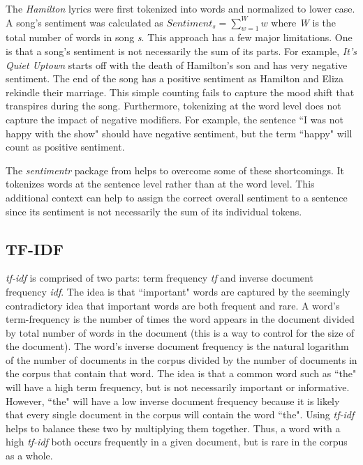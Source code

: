 \documentclass{article}
\begin{document}
The \emph{Hamilton} lyrics were first tokenized into words and normalized to lower case. A song's sentiment was calculated as $Sentiment_{s} = \sum_{w = 1}^{W}w$ where \emph{W} is the total number of words in song \emph{s}. This approach has a few major limitations. One is that a song's sentiment is not necessarily the sum of its parts. For example, \emph{It's Quiet Uptown} starts off with the death of Hamilton's son and has very negative sentiment. The end of the song has a positive sentiment as Hamilton and Eliza rekindle their marriage. This simple counting fails to capture the mood shift that transpires during the song. Furthermore, tokenizing at the word level does not capture the impact of negative modifiers. For example, the sentence ``I was not happy with the show" should have negative sentiment, but the term ``happy" will count as positive sentiment.

The \emph{sentimentr} package from \cite{sentimentr} helps to overcome some of these shortcomings. It tokenizes words at the sentence level rather than at the word level. This additional context can help to assign the correct overall sentiment to a sentence since its sentiment is not necessarily the sum of its individual tokens. 

\subsection{TF-IDF}
\label{section:tf-idf}

\emph{tf-idf} is comprised of two parts: term frequency \emph{tf} and inverse document frequency \emph{idf}. The idea is that ``important" words are captured by the seemingly contradictory idea that important words are both frequent and rare. A word's term-frequency is the number of times the word appears in the document divided by total number of words in the document (this is a way to control for the size of the document). The word's inverse document frequency is the natural logarithm of the number of documents in the corpus divided by the number of documents in the corpus that contain that word. The idea is that a common word such as ``the" will have a high term frequency, but is not necessarily important or informative. However, ``the" will have a low inverse document frequency because it is likely that every single document in the corpus will contain the word ``the". Using \emph{tf-idf} helps to balance these two by multiplying them together. Thus, a word with a high \emph{tf-idf} both occurs frequently in a given document, but is rare in the corpus as a whole. 
\end{document}
